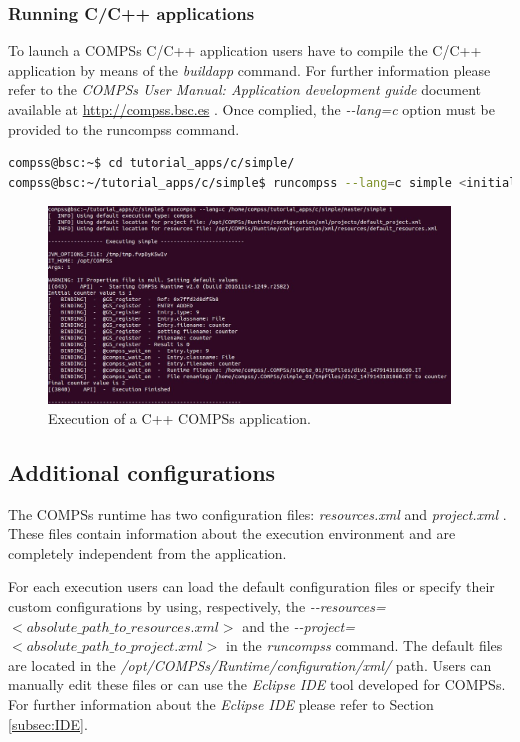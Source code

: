 \subsubsection{Running C/C++ applications}
To launch a COMPSs C/C++ application users have to compile the C/C++ application by means of the \textit{buildapp} command. For 
further information please refer to the \textit{COMPSs User Manual: Application development guide} document available at
\url{http://compss.bsc.es} . Once complied, the \textit{-{}-lang=c} option must be provided to the runcompss command.

\begin{lstlisting}[language=bash]
compss@bsc:~$ cd tutorial_apps/c/simple/
compss@bsc:~/tutorial_apps/c/simple$ runcompss --lang=c simple <initial_number>
\end{lstlisting}

\begin{figure}[h!]
  \centering
    \includegraphics[width=0.95\textwidth]{./Sections/2_Execution/Figures/c_execution.jpeg}
    \caption{Execution of a C++ COMPSs application.}
    \label{fig:c_execution}
\end{figure}
\vspace{-0.4cm}

\newpage

\subsection{Additional configurations}

The COMPSs runtime has two configuration files: \textit{resources.xml} and \textit{project.xml} . 
These files contain information about the execution environment and are completely independent from the application.

For each execution users can load the default configuration files or specify their custom configurations 
by using, respectively, the \textit{-{}-resources=$<absolute\_path\_to\_resources.xml>$} and the
\textit{-{}-project=$<absolute\_path\_to\_project.xml>$} in the \textit{runcompss} command. The default files are located 
in the \emph{/opt/COMPSs/Runtime/configuration/xml/} path. 
Users can manually edit these files or can use the \textit{Eclipse IDE} tool developed for COMPSs. For further 
information about the \textit{Eclipse IDE} please refer to Section \ref{subsec:IDE}. 


